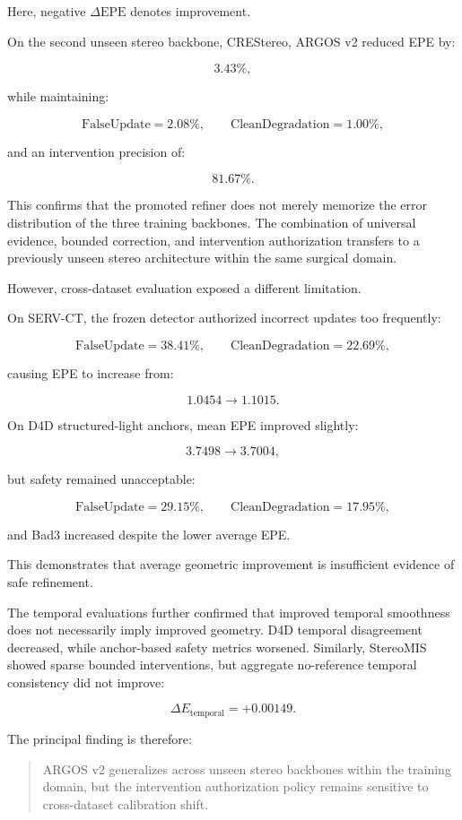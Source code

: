\documentclass[11pt,a4paper]{article}
\begin{document}
Here, negative \(\Delta\mathrm{EPE}\) denotes improvement.

On the second unseen stereo backbone, CREStereo, ARGOS v2 reduced EPE by:

\[
3.43\%,
\]

while maintaining:

\[
\mathrm{FalseUpdate}=2.08\%,
\qquad
\mathrm{CleanDegradation}=1.00\%,
\]

and an intervention precision of:

\[
81.67\%.
\]

This confirms that the promoted refiner does not merely memorize the error distribution of the three training backbones. The combination of universal evidence, bounded correction, and intervention authorization transfers to a previously unseen stereo architecture within the same surgical domain.

However, cross-dataset evaluation exposed a different limitation.

On SERV-CT, the frozen detector authorized incorrect updates too frequently:

\[
\mathrm{FalseUpdate}=38.41\%,
\qquad
\mathrm{CleanDegradation}=22.69\%,
\]

causing EPE to increase from:

\[
1.0454
\rightarrow
1.1015.
\]

On D4D structured-light anchors, mean EPE improved slightly:

\[
3.7498
\rightarrow
3.7004,
\]

but safety remained unacceptable:

\[
\mathrm{FalseUpdate}=29.15\%,
\qquad
\mathrm{CleanDegradation}=17.95\%,
\]

and Bad3 increased despite the lower average EPE.

This demonstrates that average geometric improvement is insufficient evidence of safe refinement.

The temporal evaluations further confirmed that improved temporal smoothness does not necessarily imply improved geometry. D4D temporal disagreement decreased, while anchor-based safety metrics worsened. Similarly, StereoMIS showed sparse bounded interventions, but aggregate no-reference temporal consistency did not improve:

\[
\Delta E_{\mathrm{temporal}} = +0.00149.
\]

The principal finding is therefore:

\begin{quote}
ARGOS v2 generalizes across unseen stereo backbones within the training domain, but the intervention authorization policy remains sensitive to cross-dataset calibration shift.
\end{quote}
\end{document}

